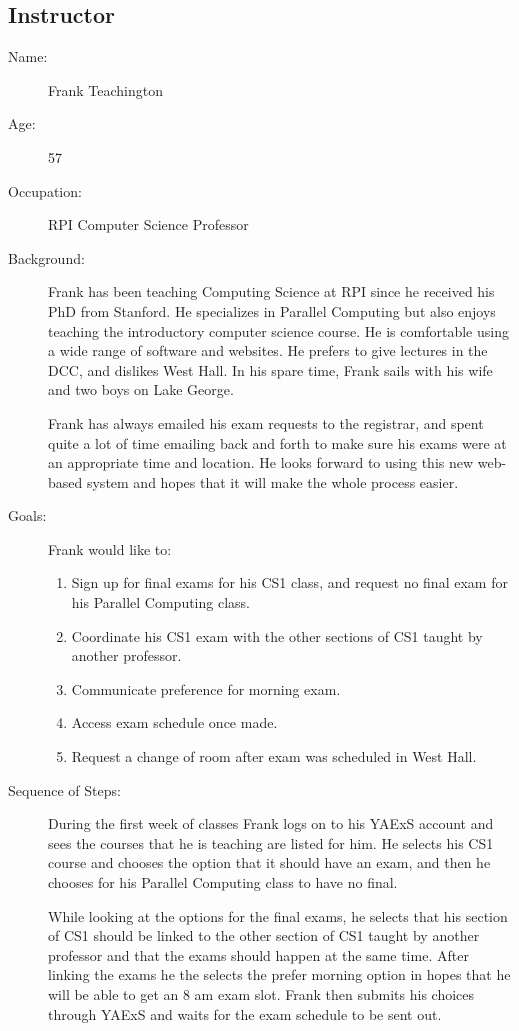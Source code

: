 \documentclass[11pt]{article}
\begin{document}
\subsection{Instructor} %
\begin{description}
\item[Name:] Frank Teachington
\item[Age:] 57
\item[Occupation:] RPI Computer Science Professor
\item[Background:] Frank has been teaching Computing Science at RPI since he received his PhD from Stanford. He specializes in Parallel Computing but also enjoys teaching the introductory computer science course. He is comfortable using a wide range of software and websites. He prefers to give lectures in the DCC, and dislikes West Hall.  In his spare time, Frank sails with his wife and two boys on Lake George.

Frank has always emailed his exam requests to the registrar, and spent quite a lot of time emailing back and forth to make sure his exams were at an appropriate time and location. He looks forward to using this new web-based system and hopes that it will make the whole process easier.

\item[Goals:]
Frank would like to:
\begin{enumerate}
\item Sign up for final exams for his CS1 class, and request no final exam for his Parallel Computing class.
\item Coordinate his CS1 exam with the other sections of CS1 taught by another professor.
\item Communicate preference for morning exam.
\item Access exam schedule once made.
\item Request a change of room after exam was scheduled in West Hall.
\end{enumerate}

\item[Sequence of Steps:]
During the first week of classes Frank logs on to his YAExS account and sees the courses that he is teaching are listed for him. He selects his CS1 course and chooses the option that it should have an exam, and then he chooses for his Parallel Computing class to have no final.

While looking at the options for the final exams, he selects that his section of CS1 should be linked to the other section of CS1 taught by another professor and that the exams should happen at the same time. After linking the exams he the selects the prefer morning option in hopes that he will be able to get an 8 am exam slot. Frank then submits his choices through YAExS and waits for the exam schedule to be sent out.


\end{description}
\end{document}
